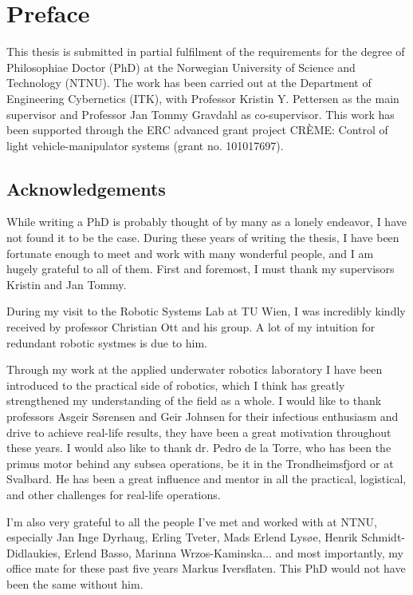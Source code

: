 \chapter*{Preface}

This thesis is submitted in partial fulfilment of the requirements for the degree of Philosophiae Doctor (PhD) at the Norwegian University of Science and Technology (NTNU). 
The work has been carried out at the Department of
Engineering Cybernetics (ITK), with Professor Kristin Y. Pettersen
as the main supervisor and Professor Jan Tommy Gravdahl as co-supervisor.
This work has been supported through the ERC advanced grant project CR\`EME: Control of light vehicle-manipulator systems (grant no. 101017697).


\section*{Acknowledgements}

While writing a PhD is probably thought of by many as a lonely endeavor, I have not found it to be the case. During these years of writing the thesis, I have been fortunate enough to meet and work with many wonderful people, and I am hugely grateful to all of them. First and foremost, I must thank my supervisors Kristin and Jan Tommy. 

During my visit to the Robotic Systems Lab at TU Wien, I was incredibly kindly received by professor Christian Ott and his group. A lot of my intuition for redundant robotic systmes is due to him. 

Through my work at the applied underwater robotics laboratory I have been introduced to the practical side of robotics, which I think has greatly strengthened my understanding of the field as a whole. I would like to thank professors Asgeir Sørensen and Geir Johnsen for their infectious enthusiasm and drive to achieve real-life results, they have been a great motivation throughout these years. I would also like to thank dr. Pedro de la Torre, who has been the primus motor behind any subsea operations, be it in the Trondheimsfjord or at Svalbard. He has been a great influence and mentor in all the practical, logistical, and other challenges for real-life operations. 

I'm also very grateful to all the people I've met and worked with at NTNU, especially Jan Inge Dyrhaug, Erling Tveter, Mads Erlend Lysøe, Henrik Schmidt-Didlaukies, Erlend Basso, Marinna Wrzos-Kaminska...
and most importantly, my office mate for these past five years Markus Iversflaten. This PhD would not have been the same without him.

